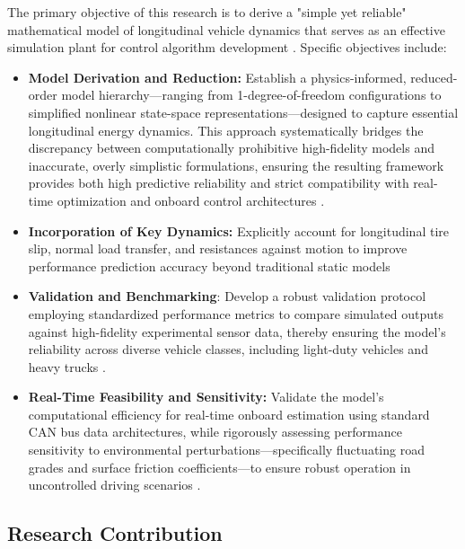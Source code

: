 \documentclass{article}
\begin{document}
The primary objective of this research is to derive a "simple yet reliable" mathematical model of longitudinal vehicle dynamics that serves as an effective simulation plant for control algorithm development  \parencite{muhammad_abdullah_7f4e5d18}. Specific objectives include:
\begin{itemize}
\item 

\textbf{Model Derivation and Reduction: }Establish a physics-informed, reduced-order model hierarchy—ranging from 1-degree-of-freedom configurations to simplified nonlinear state-space representations—designed to capture essential longitudinal energy dynamics. This approach systematically bridges the discrepancy between computationally prohibitive high-fidelity models and inaccurate, overly simplistic formulations, ensuring the resulting framework provides both high predictive reliability and strict compatibility with real-time optimization and onboard control architectures  \parencite[]{sebastian_s__james_30b34609, nour_khoudari_2d5bcaad, muhammad_abdullah_7f4e5d18}.\item 

\textbf{Incorporation of Key Dynamics:} Explicitly account for longitudinal tire slip, normal load transfer, and resistances against motion to improve performance prediction accuracy beyond traditional static models  \parencite[]{naser_sina_57baad9a, shantanu_pardhi_c6e024cf}\item 

\textbf{Validation and Benchmarking}: Develop a robust validation protocol employing standardized performance metrics to compare simulated outputs against high-fidelity experimental sensor data, thereby ensuring the model's reliability across diverse vehicle classes, including light-duty vehicles and heavy trucks  \parencite{hesham_rakha_506f0fda}.\item 

\textbf{Real-Time Feasibility and Sensitivity:} Validate the model’s computational efficiency for real-time onboard estimation using standard CAN bus data architectures, while rigorously assessing performance sensitivity to environmental perturbations—specifically fluctuating road grades and surface friction coefficients—to ensure robust operation in uncontrolled driving scenarios  \parencite{lorenzo_mosconi_2fca7202}.
\end{itemize}
\subsection{Research Contribution}
\end{document}
